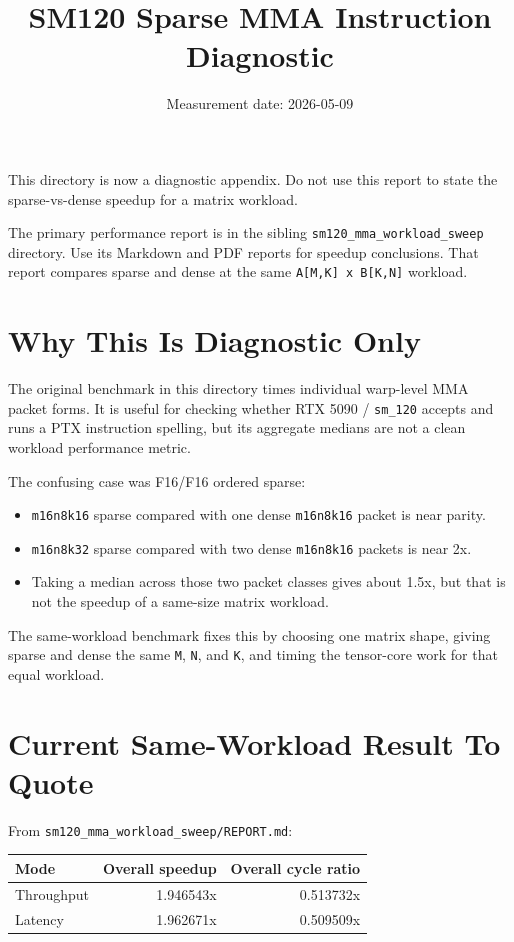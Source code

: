 \documentclass[10pt]{article}
\title{SM120 Sparse MMA Instruction Diagnostic}
\author{}
\date{Measurement date: 2026-05-09}
\begin{document}
\maketitle

This directory is now a diagnostic appendix. Do not use this report to state
the sparse-vs-dense speedup for a matrix workload.

The primary performance report is in the sibling
\texttt{sm120\_mma\_workload\_sweep} directory. Use its Markdown and PDF reports
for speedup conclusions. That report compares sparse and dense at the same
\texttt{A[M,K] x B[K,N]} workload.

\section{Why This Is Diagnostic Only}

The original benchmark in this directory times individual warp-level MMA packet
forms. It is useful for checking whether RTX 5090 / \texttt{sm\_120} accepts and
runs a PTX instruction spelling, but its aggregate medians are not a clean
workload performance metric.

The confusing case was F16/F16 ordered sparse:

\begin{itemize}
\item \texttt{m16n8k16} sparse compared with one dense \texttt{m16n8k16} packet
is near parity.
\item \texttt{m16n8k32} sparse compared with two dense \texttt{m16n8k16}
packets is near 2x.
\item Taking a median across those two packet classes gives about 1.5x, but
that is not the speedup of a same-size matrix workload.
\end{itemize}

The same-workload benchmark fixes this by choosing one matrix shape, giving
sparse and dense the same \texttt{M}, \texttt{N}, and \texttt{K}, and timing the
tensor-core work for that equal workload.

\section{Current Same-Workload Result To Quote}

From \texttt{sm120\_mma\_workload\_sweep/REPORT.md}:

\begin{center}
\small
\begin{tabular}{lrr}
\toprule
Mode & Overall speedup & Overall cycle ratio \\
\midrule
Throughput & 1.946543x & 0.513732x \\
Latency & 1.962671x & 0.509509x \\
\bottomrule
\end{tabular}
\end{center}
\end{document}
